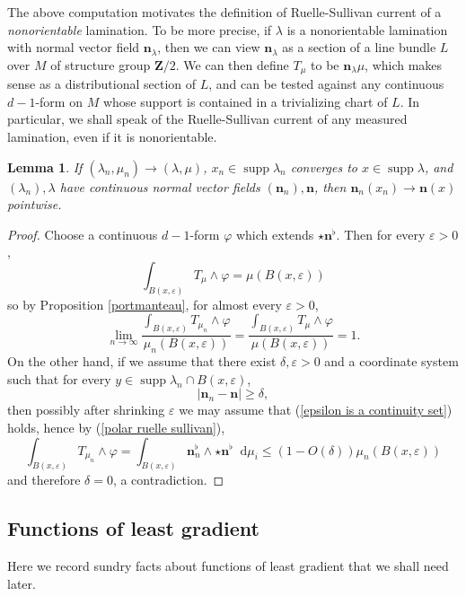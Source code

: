 \documentclass[reqno,11pt]{amsart}
\newcommand{\ZZ}{\mathbf{Z}}
\newcommand*\dif{\mathop{}\!\mathrm{d}}
\DeclareMathOperator{\supp}{supp}
\newcommand{\normal}{\mathbf n}
\newtheorem{lemma}[theorem]{Lemma}
\theoremstyle{definition}
\numberwithin{equation}{section}
\begin{document}
The above computation motivates the definition of Ruelle-Sullivan current of a \emph{nonorientable} lamination.
To be more precise, if $\lambda$ is a nonorientable lamination with normal vector field $\normal_\lambda$, then we can view $\normal_\lambda$ as a section of a line bundle $L$ over $M$ of structure group $\ZZ/2$.
We can then define $T_\mu$ to be $\normal_\lambda \mu$, which makes sense as a distributional section of $L$, and can be tested against any continuous $d-1$-form on $M$ whose support is contained in a trivializing chart of $L$.
In particular, we shall speak of the Ruelle-Sullivan current of any measured lamination, even if it is nonorientable.

\begin{lemma}\label{convergence of normals}
If $(\lambda_n, \mu_n) \to (\lambda, \mu)$, $x_n \in \supp \lambda_n$ converges to $x \in \supp \lambda$, and $(\lambda_n), \lambda$ have continuous normal vector fields $(\normal_n), \normal$, then $\normal_n(x_n) \to \normal(x)$ pointwise.
\end{lemma}
\begin{proof}
	Choose a continuous $d-1$-form $\varphi$ which extends $\star \normal^\flat$.
	Then for every $\varepsilon > 0$,
	$$\int_{B(x, \varepsilon)} T_\mu \wedge \varphi = \mu(B(x, \varepsilon))$$
	so by Proposition \ref{portmanteau}, for almost every $\varepsilon > 0$,
	\begin{equation}\label{epsilon is a continuity set}
		\lim_{n \to \infty} \frac{\int_{B(x, \varepsilon)} T_{\mu_n} \wedge \varphi}{\mu_n(B(x, \varepsilon))} = \frac{\int_{B(x, \varepsilon)} T_\mu \wedge \varphi}{\mu(B(x, \varepsilon))} = 1.
	\end{equation}
	On the other hand, if we assume that there exist $\delta, \varepsilon > 0$ and a coordinate system such that for every $y \in \supp \lambda_n \cap B(x, \varepsilon)$,
	$$|\normal_n - \normal| \geq \delta,$$
	then possibly after shrinking $\varepsilon$ we may assume that (\ref{epsilon is a continuity set}) holds, hence by (\ref{polar ruelle sullivan}),
	$$\int_{B(x, \varepsilon)} T_{\mu_n} \wedge \varphi = \int_{B(x, \varepsilon)} \normal_n^\flat \wedge \star \normal^\flat \dif \mu_i \leq (1 - O(\delta)) \mu_n(B(x, \varepsilon))$$
	and therefore $\delta = 0$, a contradiction.
\end{proof}

\subsection{Functions of least gradient}
Here we record sundry facts about functions of least gradient that we shall need later.
\end{document}
